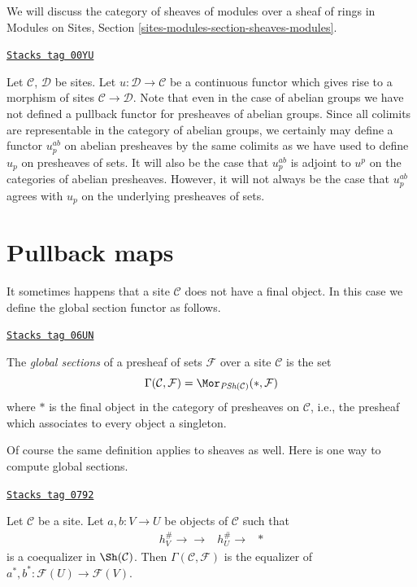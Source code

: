 We will discuss the category of sheaves of modules over a sheaf of rings in
Modules on Sites, Section \ref{sites-modules-section-sheaves-modules}.

\begin{remark}
\label{sites-remark-no-pullback-presheaves}
\href{https://stacks.math.columbia.edu/tag/00YU}{\texttt{Stacks tag 00YU}}

Let $\mathcal{C}$, $\mathcal{D}$ be sites.
Let $u : \mathcal{D} \to \mathcal{C}$ be a continuous functor
which gives rise to a morphism of sites $\mathcal{C} \to \mathcal{D}$.
Note that even in the case of abelian groups we have not defined
a pullback functor for presheaves of abelian groups.
Since all colimits are representable in
the category of abelian groups, we certainly may define
a functor $u_p^{ab}$ on abelian presheaves by the same colimits
as we have used to define $u_p$ on presheaves of sets.
It will also be the case that $u_p^{ab}$ is adjoint to
$u^p$ on the categories of abelian presheaves.
However, it will not always be the case that $u_p^{ab}$
agrees with $u_p$ on the underlying presheaves of sets.
\end{remark}

\section{Pullback maps}
\label{sites-section-pullback}
It sometimes happens that a site $\mathcal{C}$ does
not have a final object. In this case we define the
global section functor as follows.

\begin{definition}
\label{sites-definition-global-sections}
\href{https://stacks.math.columbia.edu/tag/06UN}{\texttt{Stacks tag 06UN}}

The {\it global sections} of a presheaf of sets $\mathcal{F}$ over a
site $\mathcal{C}$ is the set
$$
\Gamma(\mathcal{C}, \mathcal{F}) =
\Mor_{\textit{PSh}(\mathcal{C})}(*, \mathcal{F})
$$
where $*$ is the final object in the category of presheaves on
$\mathcal{C}$, i.e., the presheaf which associates to every object
a singleton.
\end{definition}

Of course the same definition applies to sheaves as well.
Here is one way to compute global sections.

\begin{lemma}
\label{sites-lemma-compute-global-sections}
\href{https://stacks.math.columbia.edu/tag/0792}{\texttt{Stacks tag 0792}}

Let $\mathcal{C}$ be a site. Let $a, b : V \to U$ be objects of $\mathcal{C}$
such that
$$
\begin{array}{ccc}h_V^\# \longrightarrow\longrightarrow & h_U^\# \longrightarrow & {*}\end{array}
$$
is a coequalizer in $\Sh(\mathcal{C})$. Then
$\Gamma(\mathcal{C}, \mathcal{F})$ is the equalizer of
$a^*, b^* : \mathcal{F}(U) \to \mathcal{F}(V)$.
\end{lemma}

